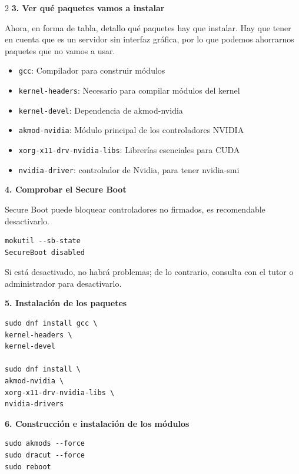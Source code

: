 \begin{multicols*}{2}
\noindent\textbf{3. Ver qué paquetes vamos a instalar}

Ahora, en forma de tabla, detallo qué paquetes hay que instalar. Hay que tener en cuenta que es un servidor sin interfaz gráfica, por lo que podemos ahorrarnos paquetes que no vamos a usar.

\begin{itemize}
    \item \texttt{gcc}: Compilador para construir módulos
    \item \texttt{kernel-headers}: Necesario para compilar módulos del kernel
    \item \texttt{kernel-devel}: Dependencia de akmod-nvidia
    \item \texttt{akmod-nvidia}: Módulo principal de los controladores NVIDIA
    \item \texttt{xorg-x11-drv-nvidia-libs}: Librerías esenciales para CUDA
    \item \texttt{nvidia-driver}: controlador de Nvidia, para tener nvidia-smi
\end{itemize}

\vspace{\baselineskip}

\noindent\textbf{4. Comprobar el Secure Boot}

Secure Boot puede bloquear controladores no firmados, es recomendable desactivarlo.
\begin{verbatim}
mokutil --sb-state
SecureBoot disabled
\end{verbatim}

Si está desactivado, no habrá problemas; de lo contrario, consulta con el tutor o administrador para desactivarlo.
\vspace{\baselineskip}

\noindent\textbf{5. Instalación de los paquetes}
\begin{verbatim}
sudo dnf install gcc \
kernel-headers \
kernel-devel

sudo dnf install \
akmod-nvidia \
xorg-x11-drv-nvidia-libs \
nvidia-drivers
\end{verbatim}

\vspace{\baselineskip}

\noindent\textbf{6. Construcción e instalación de los módulos}
\begin{verbatim}
sudo akmods --force
sudo dracut --force
sudo reboot
\end{verbatim}

\vspace{\baselineskip}


\end{multicols*}
